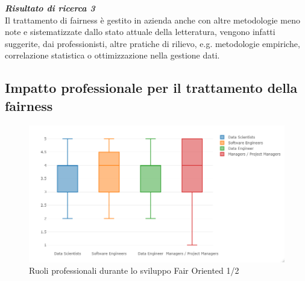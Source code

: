 	\begin{center}
	
        \begin{tcolorbox}[width=\textwidth, colframe=black, colback=Gray]
    			\begin{minipage}{\textwidth}
    				\textit{\faKey  \textbf{ Risultato di ricerca 3}}\\
    			  Il trattamento di fairness è gestito in azienda anche con altre metodologie meno note e sistematizzate dallo stato attuale della letteratura, vengono infatti suggerite, dai professionisti, altre pratiche di rilievo, e.g. metodologie empiriche, correlazione statistica o ottimizzazione nella gestione dati.
    			
    			\end{minipage}
		\end{tcolorbox}
	\end{center}
	
    \subsection{Impatto professionale per il trattamento della fairness}
	\begin{center}
		\hspace*{-5mm}%
	\end{center}
	
	  \begin{figure}[h!]
        \centering
        \includegraphics[width=1\textwidth]{figure/Analisi/RQ2/RoleImpactBoxPlot1.png}
        \caption{Ruoli professionali durante lo sviluppo Fair Oriented 1/2}
    \end{figure}
    
